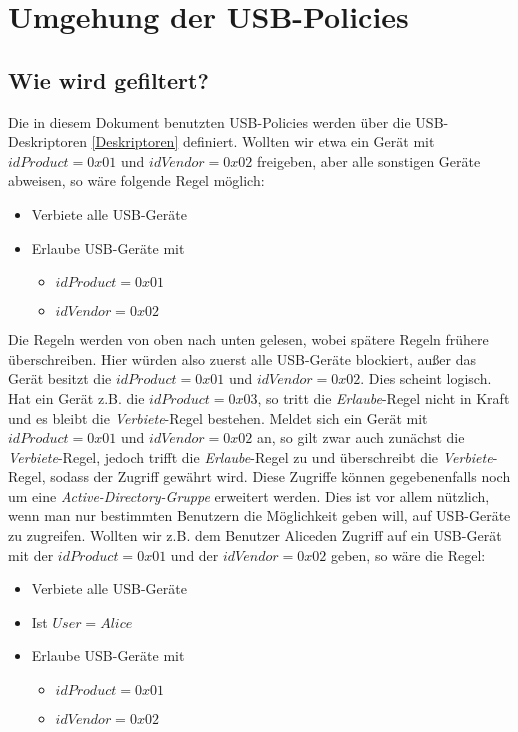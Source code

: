 \chapter{Umgehung der USB-Policies}\label{Angriff}

\section{Wie wird gefiltert?}
Die in diesem Dokument benutzten USB-Policies werden über die USB-Deskriptoren \ref{Deskriptoren} definiert. Wollten wir etwa ein Gerät mit $idProduct=0x01$ und $idVendor=0x02$ freigeben, aber alle sonstigen Geräte abweisen, so wäre folgende Regel möglich:
			\begin{itemize}
				\item Verbiete alle USB-Geräte
				\item Erlaube USB-Geräte mit
				\begin{itemize}
					\item $idProduct=0x01$
					\item $idVendor=0x02$
				\end{itemize}
			\end{itemize}
Die Regeln werden von oben nach unten gelesen, wobei spätere Regeln frühere überschreiben. Hier würden also zuerst alle USB-Geräte blockiert, außer das Gerät besitzt die $idProduct=0x01$ und $idVendor=0x02$. Dies scheint logisch. Hat ein Gerät z.B. die $idProduct=0x03$, so tritt die \textit{Erlaube}-Regel nicht in Kraft und es bleibt die \textit{Verbiete}-Regel bestehen. Meldet sich ein Gerät mit $idProduct=0x01$ und $idVendor=0x02$ an, so gilt zwar auch zunächst die \textit{Verbiete}-Regel, jedoch trifft die \textit{Erlaube}-Regel zu und überschreibt die \textit{Verbiete}-Regel, sodass der Zugriff gewährt wird.
Diese Zugriffe können gegebenenfalls noch um eine \textit{Active-Directory-Gruppe} erweitert werden. Dies ist vor allem nützlich, wenn man nur bestimmten Benutzern die Möglichkeit geben will, auf USB-Geräte zu zugreifen. Wollten wir z.B. dem Benutzer \glqq Alice\grqq den Zugriff auf ein USB-Gerät mit der $idProduct=0x01$ und der $idVendor=0x02$ geben, so wäre die Regel:
			\begin{itemize}
				\item Verbiete alle USB-Geräte
				\item Ist $User=Alice$
				\item Erlaube USB-Geräte mit
				\begin{itemize}
					\item $idProduct=0x01$
					\item $idVendor=0x02$
				\end{itemize} 
			\end{itemize}

